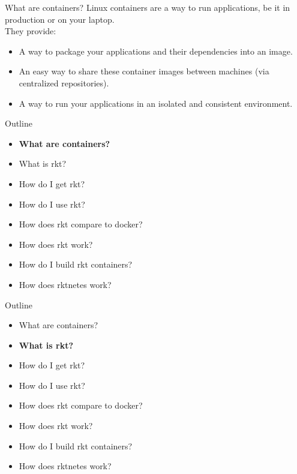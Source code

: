 \documentclass[pdf,aspectratio=169,14pt]{beamer}
\begin{document}
\begin{frame}{What are containers?}
    Linux containers are a way to run applications, be it in production or on
    your laptop. \\
    \vspace{1em}
    \pause
    They provide:
    \begin{itemize}
        \item A way to package your applications and their dependencies into an
            image.
        \item An easy way to share these container images between machines (via
            centralized repositories).
        \item A way to run your applications in an isolated and consistent
            environment.
    \end{itemize}
\end{frame}


\begin{frame}
    Outline
    \begin{itemize}
        \item \textbf{What are containers?}
        \item What is rkt?
        \item How do I get rkt?
        \item How do I use rkt?
        \item How does rkt compare to docker?
        \item How does rkt work?
        \item How do I build rkt containers?
        \item How does rktnetes work?
    \end{itemize}
\end{frame}

\begin{frame}
    Outline
    \begin{itemize}
        \item What are containers?
        \item \textbf{What is rkt?}
        \item How do I get rkt?
        \item How do I use rkt?
        \item How does rkt compare to docker?
        \item How does rkt work?
        \item How do I build rkt containers?
        \item How does rktnetes work?
    \end{itemize}
\end{frame}
\end{document}
